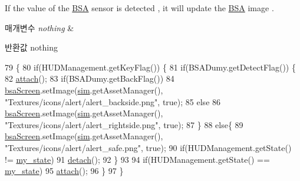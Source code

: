 If the value of the \hyperlink{namespacekr_1_1ac_1_1kookmin_1_1cs_1_1_b_s_a}{B\+S\+A} sensor is detected , it will update the \hyperlink{namespacekr_1_1ac_1_1kookmin_1_1cs_1_1_b_s_a}{B\+S\+A} image . 
\begin{DoxyParams}{매개변수}
{\em nothing} & \\
\hline
\end{DoxyParams}
\begin{DoxyReturn}{반환값}
nothing 
\end{DoxyReturn}

\begin{DoxyCode}
79   \{
80     \textcolor{keywordflow}{if}(HUDManagement.getKeyFlag()) \{      
81       \textcolor{keywordflow}{if}(BSADumy.getDetectFlag()) \{
82         \hyperlink{classkr_1_1ac_1_1kookmin_1_1cs_1_1_b_s_a_1_1_b_s_a_hud_aa92574e989e21ef14b0c53f0220dc488}{attach}();
83         \textcolor{keywordflow}{if}(BSADumy.getBackFlag())
84           \hyperlink{classkr_1_1ac_1_1kookmin_1_1cs_1_1_b_s_a_1_1_b_s_a_hud_a634791106770e96193088681b4a7cf06}{bsaScreen}.setImage(\hyperlink{classkr_1_1ac_1_1kookmin_1_1cs_1_1_b_s_a_1_1_b_s_a_hud_a94269498fba32b6567a641dc5fa3f3be}{sim}.getAssetManager(), \textcolor{stringliteral}{"Textures/icons/alert/alert\_backside.png"}, \textcolor{keyword}{
      true});
85         \textcolor{keywordflow}{else}
86           \hyperlink{classkr_1_1ac_1_1kookmin_1_1cs_1_1_b_s_a_1_1_b_s_a_hud_a634791106770e96193088681b4a7cf06}{bsaScreen}.setImage(\hyperlink{classkr_1_1ac_1_1kookmin_1_1cs_1_1_b_s_a_1_1_b_s_a_hud_a94269498fba32b6567a641dc5fa3f3be}{sim}.getAssetManager(), \textcolor{stringliteral}{"Textures/icons/alert/alert\_rightside.png"},
       \textcolor{keyword}{true});
87       \}
88       \textcolor{keywordflow}{else}\{
89         \hyperlink{classkr_1_1ac_1_1kookmin_1_1cs_1_1_b_s_a_1_1_b_s_a_hud_a634791106770e96193088681b4a7cf06}{bsaScreen}.setImage(\hyperlink{classkr_1_1ac_1_1kookmin_1_1cs_1_1_b_s_a_1_1_b_s_a_hud_a94269498fba32b6567a641dc5fa3f3be}{sim}.getAssetManager(), \textcolor{stringliteral}{"Textures/icons/alert/alert\_safe.png"}, \textcolor{keyword}{true});
90         \textcolor{keywordflow}{if}(HUDManagement.getState() != \hyperlink{classkr_1_1ac_1_1kookmin_1_1cs_1_1_b_s_a_1_1_b_s_a_hud_a90a752df5176c831c74f36190f77c0a2}{my\_state})
91           \hyperlink{classkr_1_1ac_1_1kookmin_1_1cs_1_1_b_s_a_1_1_b_s_a_hud_a7f2ad3023b835013511046876de1b38b}{detach}();
92       \}
93 
94       \textcolor{keywordflow}{if}(HUDManagement.getState() == \hyperlink{classkr_1_1ac_1_1kookmin_1_1cs_1_1_b_s_a_1_1_b_s_a_hud_a90a752df5176c831c74f36190f77c0a2}{my\_state})
95         \hyperlink{classkr_1_1ac_1_1kookmin_1_1cs_1_1_b_s_a_1_1_b_s_a_hud_aa92574e989e21ef14b0c53f0220dc488}{attach}();
96     \}
97   \}
\end{DoxyCode}


